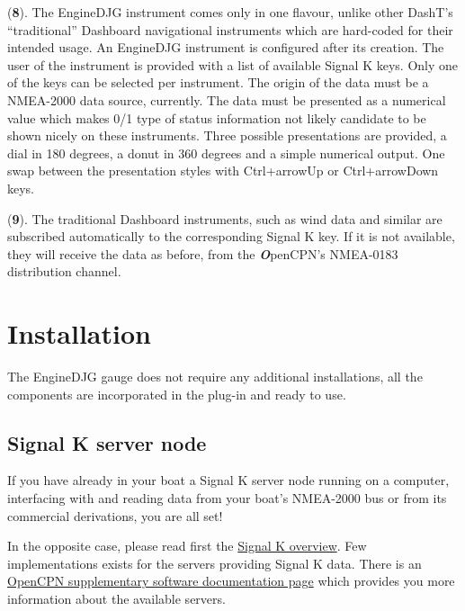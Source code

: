 \documentclass[11pt]{article}
\begin{document}
    (\textbf{8}). The EngineDJG instrument comes only in one flavour, unlike
other DashT's ``traditional'' Dashboard navigational instruments which
are hard-coded for their intended usage. An EngineDJG instrument is
configured after its creation. The user of the instrument is provided
with a list of available Signal K keys. Only one of the keys can be
selected per instrument. The origin of the data must be a NMEA-2000 data
source, currently. The data must be presented as a numerical value which
makes 0/1 type of status information not likely candidate to be shown
nicely on these instruments. Three possible presentations are provided,
a dial in 180 degrees, a donut in 360 degrees and a simple numerical
output. One swap between the presentation styles with Ctrl+arrowUp or
Ctrl+arrowDown keys.

    (\textbf{9}). The traditional Dashboard instruments, such as wind data
and similar are subscribed automatically to the corresponding Signal K
key. If it is not available, they will receive the data as before, from
the \textbf{\emph{O}}penCPN's NMEA-0183 distribution channel.

    \hypertarget{installation}{%
\section{Installation}\label{installation}}

    The EngineDJG gauge does not require any additional installations, all
the components are incorporated in the plug-in and ready to use.

    \hypertarget{signal-k-server-node}{%
\subsection{Signal K server node}\label{signal-k-server-node}}

    If you have already in your boat a Signal K server node running on a
computer, interfacing with and reading data from your boat's NMEA-2000
bus or from its commercial derivations, you are all set!

    In the opposite case, please read first the
\href{http://signalk.org/overview.html}{Signal K overview}. Few
implementations exists for the servers providing Signal K data. There is
an
\href{https://opencpn.org/wiki/dokuwiki/doku.php?id=opencpn:supplementary_software:signalk}{OpenCPN
supplementary software documentation page} which provides you more
information about the available servers.
\end{document}
